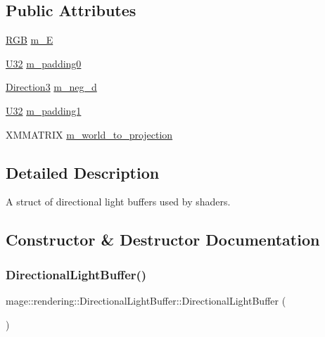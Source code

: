 \subsection*{Public Attributes}
\begin{DoxyCompactItemize}
\item 
\mbox{\hyperlink{structmage_1_1_r_g_b}{R\+GB}} \mbox{\hyperlink{structmage_1_1rendering_1_1_directional_light_buffer_aeaaec31da683b9ef189e775511db637a}{m\+\_\+E}}
\item 
\mbox{\hyperlink{namespacemage_a41c104c036fba3756a74e19f793eeaa1}{U32}} \mbox{\hyperlink{structmage_1_1rendering_1_1_directional_light_buffer_a82d9a78edf5562c3ce041d1a2a7b6a3e}{m\+\_\+padding0}}
\item 
\mbox{\hyperlink{structmage_1_1_direction3}{Direction3}} \mbox{\hyperlink{structmage_1_1rendering_1_1_directional_light_buffer_acbf55b6ed38011a695cb1feac90a64ed}{m\+\_\+neg\+\_\+d}}
\item 
\mbox{\hyperlink{namespacemage_a41c104c036fba3756a74e19f793eeaa1}{U32}} \mbox{\hyperlink{structmage_1_1rendering_1_1_directional_light_buffer_a9e86dcc4f68340eb64408cf638996a69}{m\+\_\+padding1}}
\item 
X\+M\+M\+A\+T\+R\+IX \mbox{\hyperlink{structmage_1_1rendering_1_1_directional_light_buffer_ae1c5a43c5dca80be889661a54fb3910b}{m\+\_\+world\+\_\+to\+\_\+projection}}
\end{DoxyCompactItemize}


\subsection{Detailed Description}
A struct of directional light buffers used by shaders. 

\subsection{Constructor \& Destructor Documentation}
\mbox{\label{structmage_1_1rendering_1_1_directional_light_buffer_a618dbd63423f0f008ef18c5e5a7fe560}} 
\subsubsection{\texorpdfstring{Directional\+Light\+Buffer()}{DirectionalLightBuffer()}\hspace{0.1cm}{\footnotesize\ttfamily [1/3]}}
{\footnotesize\ttfamily mage\+::rendering\+::\+Directional\+Light\+Buffer\+::\+Directional\+Light\+Buffer (\begin{DoxyParamCaption}{ }\end{DoxyParamCaption})\hspace{0.3cm}{\ttfamily [noexcept]}}

